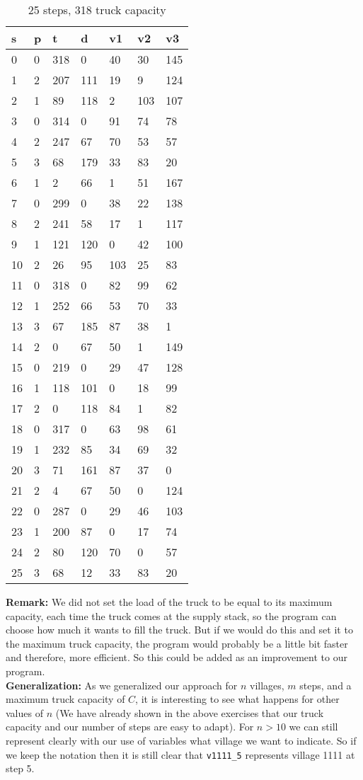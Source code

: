 \documentclass[a4paper]{article}
\begin{document}
	\begin{table}[!htb]
		\begin{longtable}[c]{@{}|l|l|l|l|l|l|l|@{}}
			\toprule
			s & p & t & d & v1 & v2 & v3\tabularnewline
			\midrule
			\endhead
			0 & 0 & 318 & 0 & 40 & 30 & 145\tabularnewline
			1 & 2 & 207 & 111 & 19 & 9 & 124\tabularnewline
			2 & 1 & 89 & 118 & 2 & 103 & 107\tabularnewline
			3 & 0 & 314 & 0 & 91 & 74 & 78\tabularnewline
			4 & 2 & 247 & 67 & 70 & 53 & 57\tabularnewline
			\rowcolor{Highlight}
			5 & 3 & 68 & 179 & 33 & 83 & 20\tabularnewline
			6 & 1 & 2 & 66 & 1 & 51 & 167\tabularnewline
			7 & 0 & 299 & 0 & 38 & 22 & 138\tabularnewline
			8 & 2 & 241 & 58 & 17 & 1 & 117\tabularnewline
			9 & 1 & 121 & 120 & 0 & 42 & 100\tabularnewline
			10 & 2 & 26 & 95 & 103 & 25 & 83\tabularnewline
			11 & 0 & 318 & 0 & 82 & 99 & 62\tabularnewline
			12 & 1 & 252 & 66 & 53 & 70 & 33\tabularnewline
			13 & 3 & 67 & 185 & 87 & 38 & 1\tabularnewline
			14 & 2 & 0 & 67 & 50 & 1 & 149\tabularnewline
			15 & 0 & 219 & 0 & 29 & 47 & 128\tabularnewline
			16 & 1 & 118 & 101 & 0 & 18 & 99\tabularnewline
			17 & 2 & 0 & 118 & 84 & 1 & 82\tabularnewline
			18 & 0 & 317 & 0 & 63 & 98 & 61\tabularnewline
			19 & 1 & 232 & 85 & 34 & 69 & 32\tabularnewline
			20 & 3 & 71 & 161 & 87 & 37 & 0\tabularnewline
			21 & 2 & 4 & 67 & 50 & 0 & 124\tabularnewline
			22 & 0 & 287 & 0 & 29 & 46 & 103\tabularnewline
			23 & 1 & 200 & 87 & 0 & 17 & 74\tabularnewline
			24 & 2 & 80 & 120 & 70 & 0 & 57\tabularnewline
			\rowcolor{Highlight}
			25 & 3 & 68 & 12 & 33 & 83 & 20\tabularnewline
			\bottomrule
		\end{longtable}
		\caption{25 steps, 318 truck capacity}
		\label{tab:1c}
	\end{table}

{\bf Remark:}
We did not set the load of the truck to be equal to its maximum capacity, each time the truck comes at the supply stack, so the program can choose how much it wants to fill the truck. But if we would do this and set it to the maximum truck capacity, the program would probably be a little bit faster and therefore, more efficient. So this could be added as an improvement to our program.\\

{\bf Generalization:} 
As we generalized our approach for $n$ villages, $m$ steps, and a maximum truck capacity of $C$, it is interesting to see what happens for other values of $n$ (We have already shown in the above exercises that our truck capacity and our number of steps are easy to adapt). For $n > 10$ we can still represent clearly with our use of variables what village we want to indicate. So if we keep the notation then it is still clear that \texttt{v1111\_5} represents village 1111 at step 5.
\end{document}
